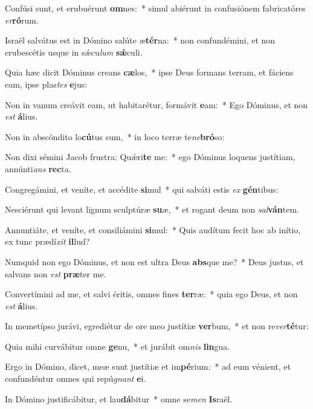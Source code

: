 \item Confúsi sunt, et erubuérunt \textbf{om}nes:~* simul abiérunt in confusiónem fabricatóres \textit{er}\textbf{ró}rum.
\item Israël salvátus est in Dómino salúte æ\textbf{tér}na:~* non confundémini, et non erubescétis usque in sǽcu\textit{lum} \textbf{sǽ}culi.
\item Quia hæc dicit Dóminus creans \textbf{cæ}los,~* ipse Deus formans terram, et fáciens eam, ipse plas\textit{tes} \textbf{e}jus:
\item Non in vanum creávit eam, ut habitarétur, formávit \textbf{e}am:~* Ego Dóminus, et non \textit{est} \textbf{á}lius.
\item Non in abscóndito lo\textbf{cú}tus sum,~* in loco terræ te\textit{ne}\textbf{bró}so:
\item Non dixi sémini Jacob frustra: Quǽri\textbf{te} me:~* ego Dóminus loquens justítiam, annúnti\textit{ans} \textbf{rec}ta.
\item Congregámini, et veníte, et accédite \textbf{si}mul~* qui salváti estis \textit{ex} \textbf{gén}tibus:
\item Nesciérunt qui levant lignum sculptúræ \textbf{su}æ,~* et rogant deum non \textit{sal}\textbf{ván}tem.
\item Annuntiáte, et veníte, et consiliámini \textbf{si}mul:~* Quis audítum fecit hoc ab inítio, ex tunc prædí\textit{xit} \textbf{il}lud?
\item Numquid non ego Dóminus, et non est ultra Deus \textbf{abs}que me?~* Deus justus, et salvans non \textit{est} \textbf{præ}ter me.
\item Convertímini ad me, et salvi éritis, omnes fines \textbf{ter}ræ:~* quia ego Deus, et non \textit{est} \textbf{á}lius.
\item In memetípso jurávi, egrediétur de ore meo justítiæ \textbf{ver}bum,~* et non re\textit{ver}\textbf{té}tur:
\item Quia mihi curvábitur omne \textbf{ge}nu,~* et jurábit om\textit{nis} \textbf{lin}gua.
\item Ergo in Dómino, dicet, meæ sunt justítiæ et im\textbf{pé}rium:~* ad eum vénient, et confundéntur omnes qui repú\textit{gnant} \textbf{e}i.
\item In Dómino justificábitur, et lau\textbf{dá}bitur~* omne se\textit{men} \textbf{Is}raël.
